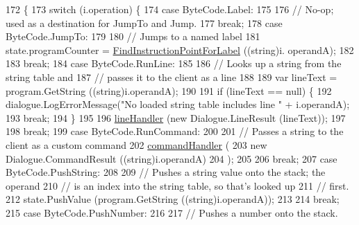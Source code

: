 \begin{DoxyCode}
172                                                     \{
173             \textcolor{keywordflow}{switch} (i.operation) \{
174             \textcolor{keywordflow}{case} ByteCode.Label:
175 
176                 \textcolor{comment}{// No-op; used as a destination for JumpTo and Jump.}
177                 \textcolor{keywordflow}{break};
178             \textcolor{keywordflow}{case} ByteCode.JumpTo:
179 
180                 \textcolor{comment}{// Jumps to a named label}
181                 state.programCounter = \hyperlink{a00136_af613c8b2d098678b6ea05b509c0a0cb6}{FindInstructionPointForLabel} ((\textcolor{keywordtype}{string})i.
      operandA);
182 
183                 \textcolor{keywordflow}{break};
184             \textcolor{keywordflow}{case} ByteCode.RunLine:
185 
186                 \textcolor{comment}{// Looks up a string from the string table and}
187                 \textcolor{comment}{// passes it to the client as a line}
188 
189                 var lineText = program.GetString ((string)i.operandA);
190 
191                 \textcolor{keywordflow}{if} (lineText == null) \{
192                     dialogue.LogErrorMessage(\textcolor{stringliteral}{"No loaded string table includes line "} + i.operandA);
193                     \textcolor{keywordflow}{break};
194                 \}
195 
196                 \hyperlink{a00136_a29b30454f068fc7e107d48bff4346fd9}{lineHandler} (\textcolor{keyword}{new} Dialogue.LineResult (lineText));
197 
198                 \textcolor{keywordflow}{break};
199             \textcolor{keywordflow}{case} ByteCode.RunCommand:
200 
201                 \textcolor{comment}{// Passes a string to the client as a custom command}
202                 \hyperlink{a00136_ab89b02227b92c74552f719afd47848e4}{commandHandler} (
203                     \textcolor{keyword}{new} Dialogue.CommandResult ((\textcolor{keywordtype}{string})i.operandA)
204                 );
205 
206                 \textcolor{keywordflow}{break};
207             \textcolor{keywordflow}{case} ByteCode.PushString:
208 
209                 \textcolor{comment}{// Pushes a string value onto the stack; the operand}
210                 \textcolor{comment}{// is an index into the string table, so that's looked up}
211                 \textcolor{comment}{// first.}
212                 state.PushValue (program.GetString ((string)i.operandA));
213 
214                 \textcolor{keywordflow}{break};
215             \textcolor{keywordflow}{case} ByteCode.PushNumber:
216 
217                 \textcolor{comment}{// Pushes a number onto the stack.}

\end{DoxyCode}
